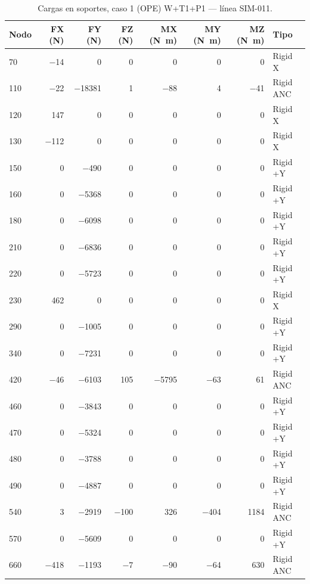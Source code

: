 \begin{table}[htbp]
  \centering
  \footnotesize
  \caption{Cargas en soportes, caso 1 (OPE) W+T1+P1 — línea SIM-011.}
  \label{tab:restricciones-ope}
  \begin{tabular}{lrrrrrrl}
    \toprule
    Nodo & FX (\si{N}) & FY (\si{N}) & FZ (\si{N}) & MX (\si{N.m}) & MY (\si{N.m}) & MZ (\si{N.m}) & Tipo \\
    \midrule
    70 & \num{-14} & \num{0} & \num{0} & \num{0} & \num{0} & \num{0} & Rigid X \\
    110 & \num{-22} & \num{-18381} & \num{1} & \num{-88} & \num{4} & \num{-41} & Rigid ANC \\
    120 & \num{147} & \num{0} & \num{0} & \num{0} & \num{0} & \num{0} & Rigid X \\
    130 & \num{-112} & \num{0} & \num{0} & \num{0} & \num{0} & \num{0} & Rigid X \\
    150 & \num{0} & \num{-490} & \num{0} & \num{0} & \num{0} & \num{0} & Rigid +Y \\
    160 & \num{0} & \num{-5368} & \num{0} & \num{0} & \num{0} & \num{0} & Rigid +Y \\
    180 & \num{0} & \num{-6098} & \num{0} & \num{0} & \num{0} & \num{0} & Rigid +Y \\
    210 & \num{0} & \num{-6836} & \num{0} & \num{0} & \num{0} & \num{0} & Rigid +Y \\
    220 & \num{0} & \num{-5723} & \num{0} & \num{0} & \num{0} & \num{0} & Rigid +Y \\
    230 & \num{462} & \num{0} & \num{0} & \num{0} & \num{0} & \num{0} & Rigid X \\
    290 & \num{0} & \num{-1005} & \num{0} & \num{0} & \num{0} & \num{0} & Rigid +Y \\
    340 & \num{0} & \num{-7231} & \num{0} & \num{0} & \num{0} & \num{0} & Rigid +Y \\
    420 & \num{-46} & \num{-6103} & \num{105} & \num{-5795} & \num{-63} & \num{61} & Rigid ANC \\
    460 & \num{0} & \num{-3843} & \num{0} & \num{0} & \num{0} & \num{0} & Rigid +Y \\
    470 & \num{0} & \num{-5324} & \num{0} & \num{0} & \num{0} & \num{0} & Rigid +Y \\
    480 & \num{0} & \num{-3788} & \num{0} & \num{0} & \num{0} & \num{0} & Rigid +Y \\
    490 & \num{0} & \num{-4887} & \num{0} & \num{0} & \num{0} & \num{0} & Rigid +Y \\
    540 & \num{3} & \num{-2919} & \num{-100} & \num{326} & \num{-404} & \num{1184} & Rigid ANC \\
    570 & \num{0} & \num{-5609} & \num{0} & \num{0} & \num{0} & \num{0} & Rigid +Y \\
    660 & \num{-418} & \num{-1193} & \num{-7} & \num{-90} & \num{-64} & \num{630} & Rigid ANC \\
    \bottomrule
  \end{tabular}
\end{table}
